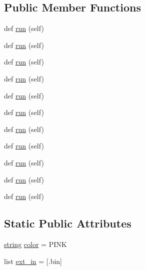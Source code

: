 \subsection*{Public Member Functions}
\begin{DoxyCompactItemize}
\item 
def \hyperlink{classwaflib_1_1_tools_1_1c__osx_1_1macplist_ae9026fb6bb09f2ac7af40a3e2cb52943}{run} (self)
\item 
def \hyperlink{classwaflib_1_1_tools_1_1c__osx_1_1macplist_ae9026fb6bb09f2ac7af40a3e2cb52943}{run} (self)
\item 
def \hyperlink{classwaflib_1_1_tools_1_1c__osx_1_1macplist_ae9026fb6bb09f2ac7af40a3e2cb52943}{run} (self)
\item 
def \hyperlink{classwaflib_1_1_tools_1_1c__osx_1_1macplist_ae9026fb6bb09f2ac7af40a3e2cb52943}{run} (self)
\item 
def \hyperlink{classwaflib_1_1_tools_1_1c__osx_1_1macplist_ae9026fb6bb09f2ac7af40a3e2cb52943}{run} (self)
\item 
def \hyperlink{classwaflib_1_1_tools_1_1c__osx_1_1macplist_ae9026fb6bb09f2ac7af40a3e2cb52943}{run} (self)
\item 
def \hyperlink{classwaflib_1_1_tools_1_1c__osx_1_1macplist_ae9026fb6bb09f2ac7af40a3e2cb52943}{run} (self)
\item 
def \hyperlink{classwaflib_1_1_tools_1_1c__osx_1_1macplist_ae9026fb6bb09f2ac7af40a3e2cb52943}{run} (self)
\item 
def \hyperlink{classwaflib_1_1_tools_1_1c__osx_1_1macplist_ae9026fb6bb09f2ac7af40a3e2cb52943}{run} (self)
\item 
def \hyperlink{classwaflib_1_1_tools_1_1c__osx_1_1macplist_ae9026fb6bb09f2ac7af40a3e2cb52943}{run} (self)
\item 
def \hyperlink{classwaflib_1_1_tools_1_1c__osx_1_1macplist_ae9026fb6bb09f2ac7af40a3e2cb52943}{run} (self)
\end{DoxyCompactItemize}
\subsection*{Static Public Attributes}
\begin{DoxyCompactItemize}
\item 
\hyperlink{test__lib_f_l_a_c_2format_8c_ab02026ad0de9fb6c1b4233deb0a00c75}{string} \hyperlink{classwaflib_1_1_tools_1_1c__osx_1_1macplist_a56f29cd2365c9688ca3b966c059f0db9}{color} = \textquotesingle{}P\+I\+NK\textquotesingle{}
\item 
list \hyperlink{classwaflib_1_1_tools_1_1c__osx_1_1macplist_aa19f03165422cb1be3148c378125cc81}{ext\+\_\+in} = \mbox{[}\textquotesingle{}.bin\textquotesingle{}\mbox{]}
\end{DoxyCompactItemize}
